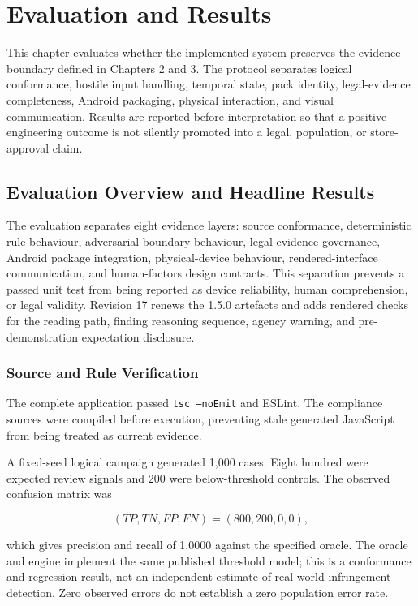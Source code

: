 \section{Evaluation and Results}

This chapter evaluates whether the implemented system preserves the evidence boundary defined in Chapters 2 and 3. The protocol separates logical conformance, hostile input handling, temporal state, pack identity, legal-evidence completeness, Android packaging, physical interaction, and visual communication. Results are reported before interpretation so that a positive engineering outcome is not silently promoted into a legal, population, or store-approval claim.

\subsection{Evaluation Overview and Headline Results}

The evaluation separates eight evidence layers: source conformance, deterministic rule behaviour, adversarial boundary behaviour, legal-evidence governance, Android package integration, physical-device behaviour, rendered-interface communication, and human-factors design contracts. This separation prevents a passed unit test from being reported as device reliability, human comprehension, or legal validity. Revision 17 renews the 1.5.0 artefacts and adds rendered checks for the reading path, finding reasoning sequence, agency warning, and pre-demonstration expectation disclosure.

\subsubsection{Source and Rule Verification}

The complete application passed \texttt{tsc --noEmit} and ESLint. The compliance sources were compiled before execution, preventing stale generated JavaScript from being treated as current evidence.

A fixed-seed logical campaign generated 1,000 cases. Eight hundred were expected review signals and 200 were below-threshold controls. The observed confusion matrix was

\begin{equation}
(TP,TN,FP,FN)=(800,200,0,0),
\end{equation}

which gives precision and recall of 1.0000 against the specified oracle. The oracle and engine implement the same published threshold model; this is a conformance and regression result, not an independent estimate of real-world infringement detection. Zero observed errors do not establish a zero population error rate.

